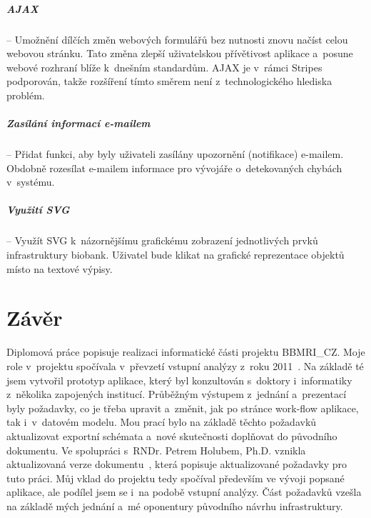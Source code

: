 \documentclass[11pt, draft, oneside]{fithesis2}
\newcommand{\ProjectName}{\mbox{BBMRI\_CZ}\xspace}
\begin{document}
\paragraph*{AJAX} -- Umožnění dílčích změn webových formulářů bez nutnosti znovu načíst celou webovou stránku. Tato změna zlepší uživatelskou přívětivost aplikace a~posune webové rozhraní blíže k~dnešním standardům. AJAX je v~rámci Stripes podporován, takže rozšíření tímto směrem není z~technologického hlediska problém.

\paragraph*{Zasílání informací e-mailem} -- Přidat funkci, aby byly uživateli zasílány upozornění (notifikace) e-mailem. Obdobně rozesílat e-mailem informace pro vývojáře o~detekovaných chybách v~systému.

\paragraph*{Využití SVG} -- Využít SVG k~názornějšímu grafickému zobrazení jednotlivých prvků infrastruktury biobank. Uživatel bude klikat na grafické reprezentace objektů místo na textové výpisy. 










\chapter{Závěr}
Diplomová práce popisuje realizaci informatické části projektu \ProjectName. Moje role v~projektu spočívala v~převzetí vstupní analýzy z~roku 2011~\cite{ARCH_2011_12_29}. Na základě té jsem vytvořil prototyp aplikace, který byl konzultován s~doktory i~informatiky z~několika zapojených institucí. Průběžným výstupem z~jednání a~prezentací byly požadavky, co je třeba upravit a~změnit, jak po stránce work-flow aplikace, tak i~v~datovém modelu. Mou prací bylo na základě těchto požadavků aktualizovat exportní schémata a~nové skutečnosti doplňovat do původního dokumentu. Ve spolupráci s~RNDr. Petrem Holubem, Ph.D. vznikla aktualizovaná verze dokumentu~\cite{ARCH_2014_1_25}, která popisuje aktualizované požadavky pro tuto práci. Můj vklad do projektu tedy spočíval především ve vývoji popsané aplikace, ale podílel jsem se i~na podobě vstupní analýzy. Část požadavků vzešla na základě mých jednání a~mé oponentury původního návrhu infrastruktury.
\end{document}
